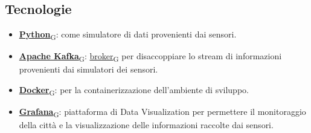 \subsection{Tecnologie}
\begin{itemize}
    \item \href{https://7last.github.io/docs/rtb/documentazione-interna/glossario\#python}{\textbf{Python}\textsubscript{G}}: come simulatore di dati provenienti dai sensori.
    \item \href{https://7last.github.io/docs/rtb/documentazione-interna/glossario\#apache-kafka}{\textbf{Apache Kafka}\textsubscript{G}}: \href{https://7last.github.io/docs/rtb/documentazione-interna/glossario\#broker}{broker\textsubscript{G}} per disaccoppiare lo stream di informazioni provenienti dai simulatori dei sensori.
    \item \href{https://7last.github.io/docs/rtb/documentazione-interna/glossario\#docker}{\textbf{Docker}\textsubscript{G}}: per la containerizzazione dell'ambiente di sviluppo.
    \item \href{https://7last.github.io/docs/rtb/documentazione-interna/glossario\#grafana}{\textbf{Grafana}\textsubscript{G}}: piattaforma di Data Visualization per permettere il monitoraggio della città e la visualizzazione delle informazioni raccolte dai sensori.
    
\end{itemize}
